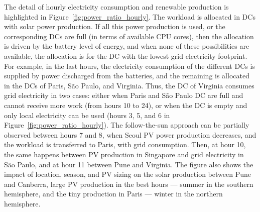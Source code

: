 The detail of hourly electricity consumption and renewable production is highlighted in Figure~\ref{fig:power_ratio_hourly}. The workload is allocated in DCs with solar power production. If all this power production is used, or the corresponding DCs are full (in terms of available CPU cores), then the allocation is driven by the battery level of energy, and when none of these possibilities are available, the allocation is for the DC with the lowest grid electricity footprint. For example, in the last hours, the electricity consumption of the different DCs is supplied by power discharged from the batteries, and the remaining is allocated in the DCs of Paris, S\~ao Paulo, and Virginia. Thus, the DC of Virginia consumes grid electricity in two cases: either when Paris and S\~ao Paulo DC are full and cannot receive more work (from hours 10 to 24), or when the DC is empty and only local electricity can be used (hours 3, 5, and 6 in Figure~\ref{fig:power_ratio_hourly}). The follow-the-sun approach can be partially observed between hours 7 and 8, when Seoul PV power production decreases, and the workload is transferred to Paris, with grid consumption. Then, at hour 10, the same happens between PV production in Singapore and grid electricity in S\~ao Paulo, and at hour 11 between Pune and Virginia. The figure also shows the impact of location, season, and PV sizing on the solar production between Pune and Canberra, large PV production in the best hours --- summer in the southern hemisphere, and the tiny production in Paris --- winter in the northern hemisphere.

